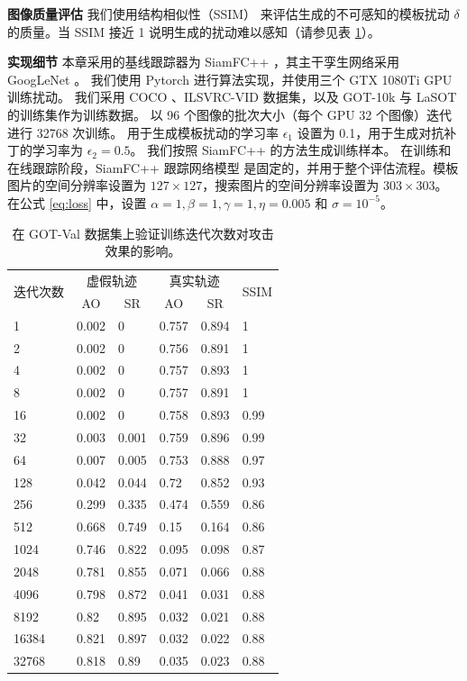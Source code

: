 \textbf{图像质量评估} 我们使用结构相似性（SSIM）\cite{SSIM} 来评估生成的不可感知的模板扰动 $\delta$ 的质量。当 SSIM 接近 1 说明生成的扰动难以感知（请参见表 \ref{tab:attack_iter}）。

\textbf{实现细节} 本章采用的基线跟踪器为 SiamFC++ \cite{SiamFC++}，其主干孪生网络采用 GoogLeNet \cite{GoogLeNet}。
我们使用 Pytorch 进行算法实现，并使用三个 GTX 1080Ti GPU 训练扰动。
我们采用 COCO \cite{COCO}、ILSVRC-VID \cite{VID} 数据集，以及 GOT-10k \cite{GOT-10k} 与 LaSOT \cite{LaSOT} 的训练集作为训练数据。
以 96 个图像的批次大小（每个 GPU 32 个图像）迭代进行 32768 次训练。
用于生成模板扰动的学习率 $\epsilon_1$ 设置为 0.1，用于生成对抗补丁的学习率为 $\epsilon_2 = 0.5$。
我们按照 SiamFC++ 的方法生成训练样本。
在训练和在线跟踪阶段，SiamFC++ 跟踪网络模型
是固定的，并用于整个评估流程。模板图片的空间分辨率设置为 $127\times 127$，搜索图片的空间分辨率设置为 $303\times 303$。
在公式 \ref{eq:loss} 中，设置 $\alpha=1, \beta=1, \gamma=1, \eta=0.005$ 和 $\sigma=10^{-5}$。

\begin{table}[t!]
\centering
\caption{在 GOT-Val 数据集上验证训练迭代次数对攻击效果的影响。}
\begin{tabular}{@{}llllll@{}}
\toprule
\multirow{2}{*}{迭代次数} & \multicolumn{2}{c}{虚假轨迹} & \multicolumn{2}{c}{真实轨迹} & \multirow{2}{*}{SSIM}\\ \cmidrule(lr){2-3} \cmidrule(lr){4-5}
 & \multicolumn{1}{c}{AO} & \multicolumn{1}{c}{SR} & \multicolumn{1}{c}{AO} & \multicolumn{1}{c}{SR} &  \\ \midrule
1 & 0.002 & 0 & 0.757 & 0.894 & 1   \\
2 & 0.002 & 0 & 0.756 & 0.891 & 1   \\
4 & 0.002 & 0 & 0.757 & 0.893 & 1   \\
8 & 0.002 & 0 & 0.757 & 0.891 & 1   \\
16 & 0.002 & 0 & 0.758 & 0.893 & 0.99 \\
32 & 0.003 & 0.001 & 0.759 & 0.896 & 0.99 \\
64 & 0.007 & 0.005 & 0.753 & 0.888 & 0.97 \\
128 & 0.042 & 0.044 & 0.72 & 0.852 & 0.93 \\
256 & 0.299 & 0.335 & 0.474 & 0.559 & 0.86 \\
512 & 0.668 & 0.749 & 0.15 & 0.164 & 0.86 \\
1024 & 0.746 & 0.822 & 0.095 & 0.098 & 0.87 \\
2048 & 0.781 & 0.855 & 0.071 & 0.066 & 0.88 \\
4096 & 0.798 & 0.872 & 0.041 & 0.031 & 0.88 \\
8192 & 0.82 & 0.895 & 0.032 & 0.021 & 0.88 \\
16384 & 0.821 & 0.897 & 0.032 & 0.022 & 0.88 \\
32768 & 0.818 & 0.89 & 0.035 & 0.023 & 0.88 \\ \bottomrule
\end{tabular}
\label{tab:attack_iter}
\end{table}

